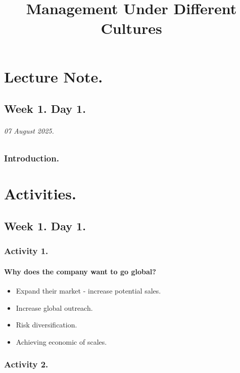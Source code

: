 \documentclass[11pt]{book}
\title{Management Under Different Cultures}
\begin{document}
\maketitle
\tableofcontents


\part{Lecture Note.}
	\chapter{Week 1. Day 1.}
			\paragraph{07 August 2025.}
		\section{Introduction.}
			


\part{Activities.}
	\chapter{Week 1. Day 1.}
		\section{Activity 1.}
			\subsection{Why does the company want to go global?}
				\begin{itemize}
					\item Expand their market - increase potential sales.
					\item Increase global outreach.
					\item Risk diversification.
					\item Achieving economic of scales.
				\end{itemize}
		
		\section{Activity 2.}
		
\end{document}
